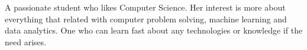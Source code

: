 

\begin{cvparagraph}

A passionate student who likes Computer Science. Her interest is more about everything that related with computer problem solving, machine learning and data analytics. One who can learn fast about any technologies or knowledge if the need arises. 
\end{cvparagraph}
